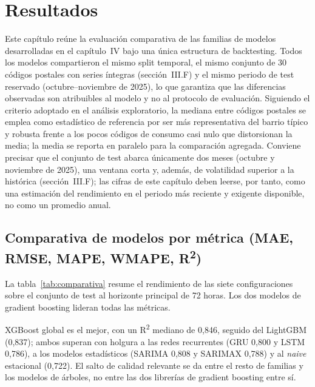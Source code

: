 \documentclass[12pt, a4paper]{article}
\begin{document}
\section{Resultados}

Este capítulo reúne la evaluación comparativa de las familias de modelos desarrolladas en el capítulo~IV bajo una única estructura de backtesting. Todos los modelos compartieron el mismo split temporal, el mismo conjunto de 30 códigos postales con series íntegras (sección~III.F) y el mismo periodo de test reservado (octubre--noviembre de 2025), lo que garantiza que las diferencias observadas son atribuibles al modelo y no al protocolo de evaluación. Siguiendo el criterio adoptado en el análisis exploratorio, la mediana entre códigos postales se emplea como estadístico de referencia por ser más representativa del barrio típico y robusta frente a los pocos códigos de consumo casi nulo que distorsionan la media; la media se reporta en paralelo para la comparación agregada. Conviene precisar que el conjunto de test abarca únicamente dos meses (octubre y noviembre de 2025), una ventana corta y, además, de volatilidad superior a la histórica (sección~III.F); las cifras de este capítulo deben leerse, por tanto, como una estimación del rendimiento en el periodo más reciente y exigente disponible, no como un promedio anual.

\subsection{Comparativa de modelos por métrica (MAE, RMSE, MAPE, WMAPE, R\textsuperscript{2})}

La tabla~\ref{tab:comparativa} resume el rendimiento de las siete configuraciones sobre el conjunto de test al horizonte principal de 72 horas. Los dos modelos de gradient boosting lideran todas las métricas.

XGBoost global es el mejor, con un R\textsuperscript{2} mediano de 0,846, seguido del LightGBM (0,837); ambos superan con holgura a las redes recurrentes (GRU 0,800 y LSTM 0,786), a los modelos estadísticos (SARIMA 0,808 y SARIMAX 0,788) y al \textit{naive} estacional (0,722). El salto de calidad relevante se da entre el resto de familias y los modelos de árboles, no entre las dos librerías de gradient boosting entre sí.
\end{document}
